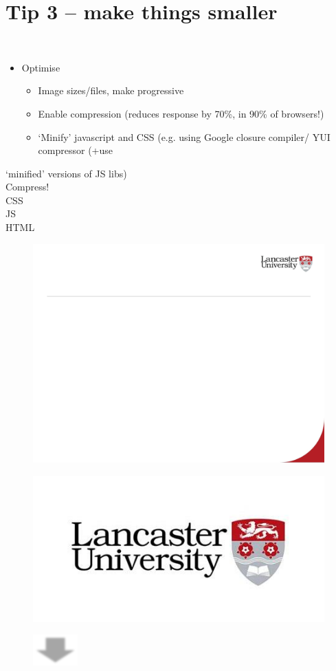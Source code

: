 \documentclass[12pt]{article}
\begin{document}
\section{Tip 3 – make things smaller}
\\
\begin{itemize}
  \item Optimise
\begin{itemize}
  \item Image sizes/files, make progressive
  \item Enable compression (reduces response by 70\%, in 90\% of browsers!)
  \item ‘Minify’ javascript and CSS (e.g. using Google closure compiler/ YUI compressor (+use 
\end{itemize}
\end{itemize}
‘minified’ versions of JS libs)\\
Compress!\\
CSS\\
JS\\
HTML\\
\begin{figure}[H]
\includegraphics[width=0.5\linewidth]{page54-image-1.png}
\end{figure}
\begin{figure}[H]
\includegraphics[width=0.5\linewidth]{page54-image-2.png}
\end{figure}
\begin{figure}[H]
\includegraphics[width=0.5\linewidth]{page54-image-3.png}
\end{figure}
\end{document}
